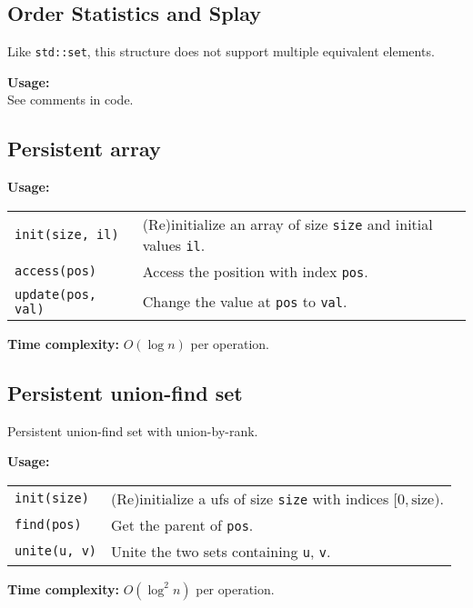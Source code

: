 \subsection{Order Statistics and Splay}
\Warning Like \lstinline|std::set|, this structure does not support multiple equivalent elements. \par
\textbf{Usage:} \\[0.1cm]
See comments in code.



%

\subsection{Persistent array}
\textbf{Usage:} \\[0.1cm]
\begin{tabular}{p{4cm} p{7.5cm}}
  \lstinline|init(size, il)| & (Re)initialize an array of size \lstinline|size| and initial values \lstinline|il|. \\
  \lstinline|access(pos)| & Access the position with index \lstinline|pos|.\\
  \lstinline|update(pos, val)| & Change the value at \lstinline|pos| to \lstinline|val|. \\
\end{tabular} \par
\textbf{Time complexity:} $O(\log n)$ per operation. \par


\subsection{Persistent union-find set}
Persistent union-find set with union-by-rank. \par
\textbf{Usage:} \\[0.1cm]
\begin{tabular}{p{4cm} p{7.5cm}}
  \lstinline|init(size)| & (Re)initialize a ufs of size \lstinline|size| with indices $[0, \mathrm{size})$. \\
  \lstinline|find(pos)| & Get the parent of \lstinline|pos|.\\
  \lstinline|unite(u, v)| & Unite the two sets containing \lstinline|u|, \lstinline|v|. \\
\end{tabular} \par
\textbf{Time complexity:} $O(\log^2 n)$ per operation. \par



